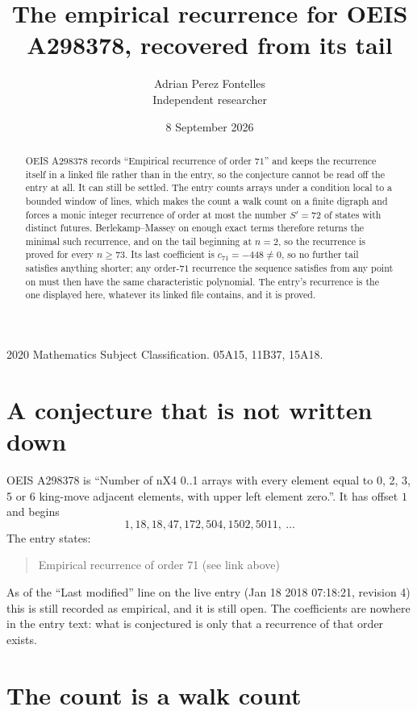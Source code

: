\documentclass[11pt,a4paper]{article}
\title{The empirical recurrence for OEIS A298378, recovered from its tail}
\author{Adrian Perez Fontelles\\ \small Independent researcher}
\date{8 September 2026}
\theoremstyle{plain}
\theoremstyle{definition}
\begin{document}
\maketitle

\begin{abstract}
OEIS A298378 records ``Empirical recurrence of order $71$'' and keeps the recurrence itself in
a linked file rather than in the entry, so the conjecture cannot be read off the entry at all.
It can still be settled. The entry counts arrays under a condition local to a bounded window of
lines, which makes the count a walk count on a finite digraph and forces a monic integer
recurrence of order at most the number $S'=72$ of states with distinct futures. Berlekamp--Massey on
enough exact terms therefore returns the minimal such recurrence, and on the tail beginning at $n=2$, so the recurrence is proved for every $n\ge73$.
Its last coefficient is $c_{71}=-448\neq0$, so no further tail satisfies anything
shorter; any order-$71$ recurrence the sequence satisfies from any point on must then have
the same characteristic polynomial. The entry's recurrence is the one displayed here, whatever
its linked file contains, and it is proved.
\end{abstract}

\noindent\small 2020 Mathematics Subject Classification. 05A15, 11B37, 15A18.\normalsize

\section{A conjecture that is not written down}

OEIS A298378 is ``Number of nX4 0..1 arrays with every element equal to 0, 2, 3, 5 or 6 king-move adjacent elements, with upper left element zero.''. It has offset $1$ and begins
\[
1, 18, 18, 47, 172, 504, 1502, 5011,\ \dots
\]
The entry states:
\begin{quote}
Empirical recurrence of order 71 (see link above)
\end{quote}
As of the ``Last modified'' line on the live entry (Jan 18 2018 07:18:21, revision 4)
this is still recorded as empirical, and it is still open. The coefficients are nowhere in the
entry text: what is conjectured is only that a recurrence of that order exists.

\section{The count is a walk count}
\end{document}
